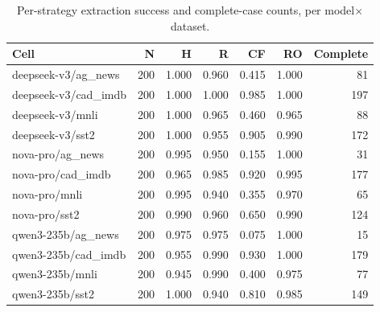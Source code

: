 \begin{table}[t]
\centering
\caption{Per-strategy extraction success and complete-case counts, per model$\times$dataset.}
\label{tab:coverage}
\begin{tabular}{lrrrrrr}
\toprule
Cell & N & H & R & CF & RO & Complete \\
\midrule
deepseek-v3/ag_news & 200 & 1.000 & 0.960 & 0.415 & 1.000 & 81 \\
deepseek-v3/cad_imdb & 200 & 1.000 & 1.000 & 0.985 & 1.000 & 197 \\
deepseek-v3/mnli & 200 & 1.000 & 0.965 & 0.460 & 0.965 & 88 \\
deepseek-v3/sst2 & 200 & 1.000 & 0.955 & 0.905 & 0.990 & 172 \\
nova-pro/ag_news & 200 & 0.995 & 0.950 & 0.155 & 1.000 & 31 \\
nova-pro/cad_imdb & 200 & 0.965 & 0.985 & 0.920 & 0.995 & 177 \\
nova-pro/mnli & 200 & 0.995 & 0.940 & 0.355 & 0.970 & 65 \\
nova-pro/sst2 & 200 & 0.990 & 0.960 & 0.650 & 0.990 & 124 \\
qwen3-235b/ag_news & 200 & 0.975 & 0.975 & 0.075 & 1.000 & 15 \\
qwen3-235b/cad_imdb & 200 & 0.955 & 0.990 & 0.930 & 1.000 & 179 \\
qwen3-235b/mnli & 200 & 0.945 & 0.990 & 0.400 & 0.975 & 77 \\
qwen3-235b/sst2 & 200 & 1.000 & 0.940 & 0.810 & 0.985 & 149 \\
\bottomrule
\end{tabular}
\end{table}
